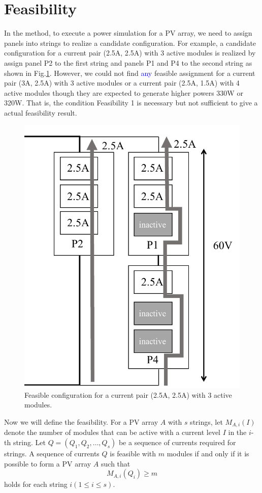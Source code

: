 \documentclass[conference]{pvsctran}
\newcommand{\michiko}{\textcolor{blue}}
\begin{document}
\section{Feasibility}
In the method\cite{orozco2016optimized}, to execute a power simulation for a PV array, we need to assign panels into strings to realize a candidate configuration. 
For example, a candidate configuration for a current pair (2.5A, 2.5A) with 3 active modules is realized by assign panel P2  to the first string and panels P1 and P4 to the second string as shown in Fig.\ref{fig:feasible-configuration}. 
However, we could not find \michiko{any} feasible assignment for a current pair (3A, 2.5A) with 3 active modules or a current pair (2.5A, 1.5A) with 4 active modules though they are expected to generate higher powers 330W or 320W. 
That is, the condition Feasibility 1 is necessary but not sufficient to give a actual feasibility result.

\begin{figure}[b]
    \centering
    \includegraphics[width=0.6\linewidth]{../fig/feasible-configuration-vertical.pdf}
    \caption{Feasible configuration for a current pair (2.5A, 2.5A) with 3 active modules.}
    \label{fig:feasible-configuration}
\end{figure}

Now we will define the feasibility. For a PV array $A$ with $s$ strings, let $M_{A,i}(I)$ denote the number of modules that can be active with a current level $I$ in the $i$-th string.
Let $Q = (Q_{1},Q_{2},\ldots ,Q_{s})$ be a sequence of currents required for strings. 
A sequence of currents $Q$ is feasible with $m$ modules if and only if it is possible to form a PV array $A$ such that 
\begin{equation}
M_{A,i}(Q_{i}) \geq m
\end{equation}
holds for each string $i (1 \leq i \leq s)$.
\end{document}
